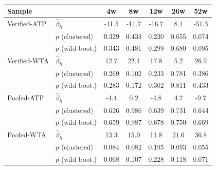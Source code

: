 \begin{tabular}{ll*{5}{c}}
\toprule
Sample & & 4w & 8w & 12w & 26w & 52w \\
\midrule
Verified-ATP & $\hat{\beta}_h$ & -11.5 & -11.7 & -16.7 & 8.1 & -51.3 \\
 & $p$ (clustered) & 0.329 & 0.433 & 0.230 & 0.655 & 0.074 \\
 & $p$ (wild boot.) & 0.343 & 0.481 & 0.299 & 0.680 & 0.095 \\[0.3em]
Verified-WTA & $\hat{\beta}_h$ & 12.7 & 22.1 & 17.8 & 5.2 & 26.9 \\
 & $p$ (clustered) & 0.269 & 0.102 & 0.233 & 0.781 & 0.386 \\
 & $p$ (wild boot.) & 0.283 & 0.172 & 0.302 & 0.811 & 0.433 \\[0.3em]
Pooled-ATP & $\hat{\beta}_h$ & -4.4 & 0.2 & -4.8 & 4.7 & -9.7 \\
 & $p$ (clustered) & 0.626 & 0.986 & 0.639 & 0.731 & 0.644 \\
 & $p$ (wild boot.) & 0.659 & 0.987 & 0.678 & 0.750 & 0.669 \\[0.3em]
Pooled-WTA & $\hat{\beta}_h$ & 13.3 & 15.0 & 11.8 & 21.6 & 36.8 \\
 & $p$ (clustered) & 0.084 & 0.082 & 0.195 & 0.093 & 0.055 \\
 & $p$ (wild boot.) & 0.068 & 0.107 & 0.228 & 0.118 & 0.071 \\[0.3em]
\bottomrule
\end{tabular}
